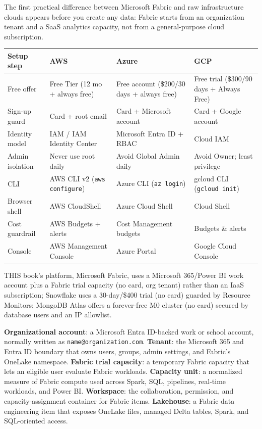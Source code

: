 \begin{crosscloud}
The first practical difference between Microsoft Fabric and raw infrastructure clouds appears before you create any data: Fabric starts from an organization tenant and a SaaS analytics capacity, not from a general-purpose cloud subscription.

\vspace{2mm}
{\footnotesize
\begin{tabular}{@{}p{2.9cm}p{3.0cm}p{3.0cm}p{3.0cm}@{}}
\toprule
\textbf{Setup step} & \textbf{AWS} & \textbf{Azure} & \textbf{GCP} \\
\midrule
Free offer & Free Tier (12 mo + always free) & Free account (\$200/30 days + always free) & Free trial (\$300/90 days + Always Free) \\
Sign-up guard & Card + root email & Card + Microsoft account & Card + Google account \\
Identity model & IAM / IAM Identity Center & Microsoft Entra ID + RBAC & Cloud IAM \\
Admin isolation & Never use root daily & Avoid Global Admin daily & Avoid Owner; least privilege \\
CLI & AWS CLI v2 (\texttt{aws configure}) & Azure CLI (\texttt{az login}) & gcloud CLI (\texttt{gcloud init}) \\
Browser shell & AWS CloudShell & Azure Cloud Shell & Cloud Shell \\
Cost guardrail & AWS Budgets + alerts & Cost Management budgets & Budgets \& alerts \\
Console & AWS Management Console & Azure Portal & Google Cloud Console \\
\bottomrule
\end{tabular}}

\vspace{1mm}
THIS book's platform, Microsoft Fabric, uses a Microsoft 365/Power BI work account plus a Fabric trial capacity (no card, org tenant) rather than an IaaS subscription; Snowflake uses a 30-day/\$400 trial (no card) guarded by Resource Monitors; MongoDB Atlas offers a forever-free M0 cluster (no card) secured by database users and an IP allowlist.
\end{crosscloud}

\begin{keyterms}
\textbf{Organizational account}: a Microsoft Entra ID-backed work or school account, normally written as \texttt{name@organization.com}. \quad
\textbf{Tenant}: the Microsoft 365 and Entra ID boundary that owns users, groups, admin settings, and Fabric's OneLake namespace. \quad
\textbf{Fabric trial capacity}: a temporary Fabric capacity that lets an eligible user evaluate Fabric workloads. \quad
\textbf{Capacity unit}: a normalized measure of Fabric compute used across Spark, SQL, pipelines, real-time workloads, and Power BI. \quad
\textbf{Workspace}: the collaboration, permission, and capacity-assignment container for Fabric items. \quad
\textbf{Lakehouse}: a Fabric data engineering item that exposes OneLake files, managed Delta tables, Spark, and SQL-oriented access.
\end{keyterms}

